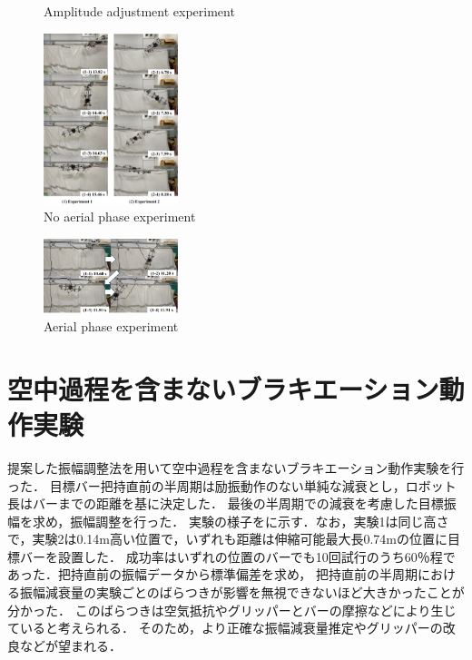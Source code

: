 \begin{small}
\begin{figure}[h]
  \caption{Amplitude adjustment experiment}
\end{figure}
\begin{figure}[h]
  \centering
  \includegraphics[width=0.35\textwidth]{fig/NoAerialForMaezuri.eps} %
  \vspace{-5mm}
  \caption{No aerial phase experiment}
\end{figure}
\begin{figure}[h]
  \centering
  \includegraphics[width=0.35\textwidth]{fig/AerialForMaezuri.eps} %
  \vspace{-5mm}
  \caption{Aerial phase experiment}
\end{figure}
\section{空中過程を含まないブラキエーション動作実験}
\vspace{-2mm}
提案した振幅調整法を用いて空中過程を含まないブラキエーション動作実験を行った．
目標バー把持直前の半周期は励振動作のない単純な減衰とし，ロボット長はバーまでの距離を基に決定した．
最後の半周期での減衰を考慮した目標振幅を求め，振幅調整を行った．
実験の様子をに示す．なお，実験1は同じ高さで，実験2は0.14m高い位置で，いずれも距離は伸縮可能最大長0.74mの位置に目標バーを設置した．
成功率はいずれの位置のバーでも10回試行のうち60％程であった．把持直前の振幅データから標準偏差を求め，
把持直前の半周期における振幅減衰量の実験ごとのばらつきが影響を無視できないほど大きかったことが分かった．
このばらつきは空気抵抗やグリッパーとバーの摩擦などにより生じていると考えられる．
そのため，より正確な振幅減衰量推定やグリッパーの改良などが望まれる．

\end{small}
